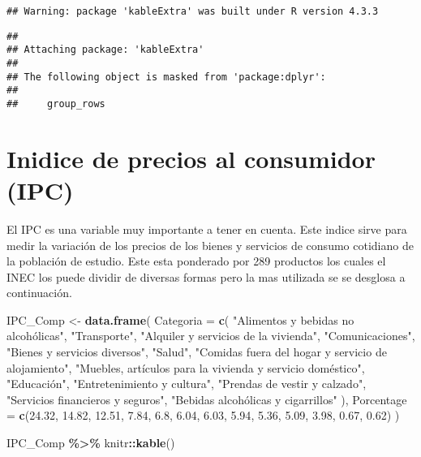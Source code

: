 \documentclass[
]{article}
\newenvironment{Shaded}{\begin{snugshade}}{\end{snugshade}}
\newcommand{\AttributeTok}[1]{\textcolor[rgb]{0.13,0.29,0.53}{#1}}
\newcommand{\FloatTok}[1]{\textcolor[rgb]{0.00,0.00,0.81}{#1}}
\newcommand{\FunctionTok}[1]{\textcolor[rgb]{0.13,0.29,0.53}{\textbf{#1}}}
\newcommand{\NormalTok}[1]{#1}
\newcommand{\OtherTok}[1]{\textcolor[rgb]{0.56,0.35,0.01}{#1}}
\newcommand{\SpecialCharTok}[1]{\textcolor[rgb]{0.81,0.36,0.00}{\textbf{#1}}}
\newcommand{\StringTok}[1]{\textcolor[rgb]{0.31,0.60,0.02}{#1}}
\begin{document}
\begin{verbatim}
## Warning: package 'kableExtra' was built under R version 4.3.3
\end{verbatim}

\begin{verbatim}
## 
## Attaching package: 'kableExtra'
## 
## The following object is masked from 'package:dplyr':
## 
##     group_rows
\end{verbatim}

\hypertarget{inidice-de-precios-al-consumidor-ipc}{%
\section{Inidice de precios al consumidor
(IPC)}\label{inidice-de-precios-al-consumidor-ipc}}

El IPC es una variable muy importante a tener en cuenta. Este indice
sirve para medir la variación de los precios de los bienes y servicios
de consumo cotidiano de la población de estudio. Este esta ponderado por
289 productos los cuales el INEC los puede dividir de diversas formas
pero la mas utilizada se se desglosa a continuación.

\begin{Shaded}
\begin{Highlighting}[]
\NormalTok{IPC\_Comp }\OtherTok{\textless{}{-}} \FunctionTok{data.frame}\NormalTok{(}
  \AttributeTok{Categoria =} \FunctionTok{c}\NormalTok{(}
    \StringTok{"Alimentos y bebidas no alcohólicas"}\NormalTok{,}
    \StringTok{"Transporte"}\NormalTok{,}
    \StringTok{"Alquiler y servicios de la vivienda"}\NormalTok{,}
    \StringTok{"Comunicaciones"}\NormalTok{,}
    \StringTok{"Bienes y servicios diversos"}\NormalTok{,}
    \StringTok{"Salud"}\NormalTok{,}
    \StringTok{"Comidas fuera del hogar y servicio de alojamiento"}\NormalTok{,}
    \StringTok{"Muebles, artículos para la vivienda y servicio doméstico"}\NormalTok{,}
    \StringTok{"Educación"}\NormalTok{,}
    \StringTok{"Entretenimiento y cultura"}\NormalTok{,}
    \StringTok{"Prendas de vestir y calzado"}\NormalTok{,}
    \StringTok{"Servicios financieros y seguros"}\NormalTok{,}
    \StringTok{"Bebidas alcohólicas y cigarrillos"}
\NormalTok{  ),}
  \AttributeTok{Porcentage =} \FunctionTok{c}\NormalTok{(}\FloatTok{24.32}\NormalTok{, }\FloatTok{14.82}\NormalTok{, }\FloatTok{12.51}\NormalTok{, }\FloatTok{7.84}\NormalTok{, }\FloatTok{6.8}\NormalTok{, }\FloatTok{6.04}\NormalTok{, }\FloatTok{6.03}\NormalTok{, }\FloatTok{5.94}\NormalTok{, }\FloatTok{5.36}\NormalTok{, }\FloatTok{5.09}\NormalTok{, }\FloatTok{3.98}\NormalTok{, }\FloatTok{0.67}\NormalTok{, }\FloatTok{0.62}\NormalTok{)}
\NormalTok{)}

\NormalTok{IPC\_Comp }\SpecialCharTok{\%\textgreater{}\%}\NormalTok{ knitr}\SpecialCharTok{::}\FunctionTok{kable}\NormalTok{()}
\end{Highlighting}
\end{Shaded}
\end{document}
